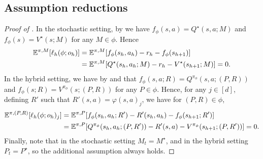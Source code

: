 \subsection{Assumption reductions}
\begin{proof}[Proof of ]
In the stochastic setting, by  we have $f_{\phi}(s,a)=Q^{\star}(s,a;M)$ and $f_{\phi}(s)=V^{\star}(s;M)$ for any $M\in\phi$. Hence
\begin{align*}
        \mathbb{E}^{\pi, M}[\ell_h(\phi; o_h)] &= \mathbb{E}^{\pi, M}[f_{\phi}(s_h,a_h)-r_h-f_{\phi}(s_{h+1})]\\
        &=\mathbb{E}^{\pi, M}[Q^{\star}(s_h,a_h;M)-r_h-V^\star(s_{h+1};M)]=0.    
    \end{align*}
In the hybrid setting, we have by  and  that 
$f_{\phi}(s,a;R)=Q^{\pi_{\phi}}(s,a;(P,R))$ and $f_{\phi}(s;R)=V^{\pi_{\phi}}(s;(P,R))$ for any $P\in\phi$. Hence, for any $j\in[d]$, defining $R'$ such that $R'(s,a)=\varphi(s,a)_j$, we have for $(P,R)\in\phi$, 
\begin{align*}
    \mathbb{E}^{\pi, (P,R)}[\ell_h(\phi; o_h)_j] &= \mathbb{E}^{\pi, P}[f_{\phi}(s_h,a_h;R')-R'(s_h,a_h)-f_{\phi}(s_{h+1};R')]\\
        &=\mathbb{E}^{\pi, P}[Q^{\pi_{\phi}}(s_h,a_h;(P,R'))-R'(s,a)-V^{\pi_{\phi}}(s_{h+1};(P,R'))]=0. 
\end{align*}
Finally, note that in the stochastic setting $M_t=M^\star$, and in the hybrid setting $P_t=P^\star$, so the additional assumption always holds.
\end{proof}
